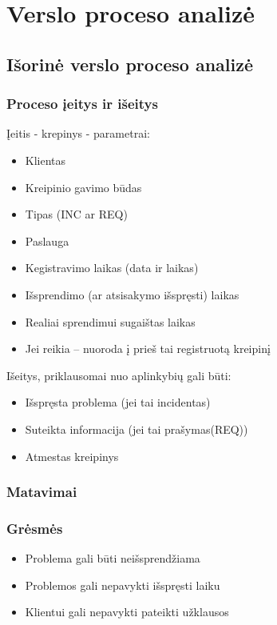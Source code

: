 \section{Verslo proceso analizė}

\subsection{Išorinė verslo proceso analizė}
\subsubsection{Proceso įeitys ir išeitys}
Įeitis - krepinys - parametrai:
\begin{itemize}
\item Klientas
\item Kreipinio gavimo būdas
\item Tipas (INC ar REQ)
\item Paslauga
\item Kegistravimo laikas (data ir laikas)
\item Išsprendimo (ar atsisakymo išspręsti) laikas
\item Realiai sprendimui sugaištas laikas
\item Jei reikia – nuoroda į prieš tai registruotą kreipinį
\end{itemize}

Išeitys, priklausomai nuo aplinkybių gali būti:
\begin{itemize}
\item Išspręsta problema (jei tai incidentas)
\item Suteikta informacija (jei tai prašymas(REQ))
\item Atmestas kreipinys
\end{itemize}

\subsubsection{Matavimai}
\subsubsection{Grėsmės}
\begin{itemize}
\item Problema gali būti neišsprendžiama
\item Problemos gali nepavykti išspręsti laiku
\item Klientui gali nepavykti pateikti užklausos
\end{itemize}

